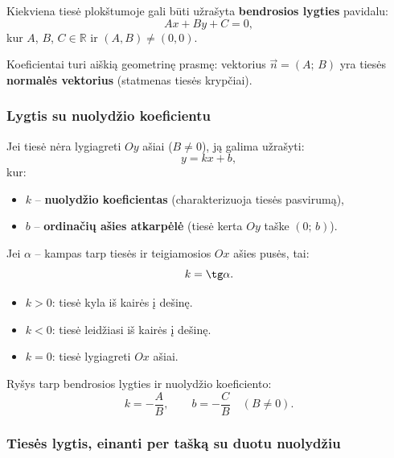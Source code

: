 \begin{definition}
Kiekviena tiesė plokštumoje gali būti užrašyta \textbf{bendrosios lygties} pavidalu:
\[
    Ax + By + C = 0,
\]
kur $A$, $B$, $C \in \mathbb{R}$ ir $(A, B) \neq (0, 0)$.
\end{definition}

Koeficientai turi aiškią geometrinę prasmę: vektorius $\vec{n} = (A;\, B)$ yra tiesės \textbf{normalės vektorius} (statmenas tiesės krypčiai).

\subsubsection*{Lygtis su nuolydžio koeficientu}

\begin{definition}
Jei tiesė nėra lygiagreti $Oy$ ašiai ($B \neq 0$), ją galima užrašyti:
\[
    y = kx + b,
\]
kur:
\begin{itemize}
    \item $k$ – \textbf{nuolydžio koeficientas} (charakterizuoja tiesės pasvirumą),
    \item $b$ – \textbf{ordinačių ašies atkarpėlė} (tiesė kerta $Oy$ taške $(0;\, b)$).
\end{itemize}
\end{definition}

\begin{definition}
Jei $\alpha$ – kampas tarp tiesės ir teigiamosios $Ox$ ašies pusės, tai:
\[
    k = \tg \alpha.
\]
\begin{itemize}
    \item $k > 0$: tiesė kyla iš kairės į dešinę.
    \item $k < 0$: tiesė leidžiasi iš kairės į dešinę.
    \item $k = 0$: tiesė lygiagreti $Ox$ ašiai.
\end{itemize}
\end{definition}

Ryšys tarp bendrosios lygties ir nuolydžio koeficiento:
\[
    k = -\frac{A}{B}, \qquad b = -\frac{C}{B} \quad (B \neq 0).
\]

\subsubsection*{Tiesės lygtis, einanti per tašką su duotu nuolydžiu}


